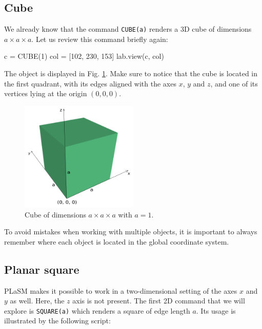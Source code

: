 \subsection{Cube}

We already know that the command {\tt CUBE(a)} renders a 3D cube of
dimensions $a \times a \times a$. Let us review this command briefly again:

\begin{bluecode}
c = CUBE(1)
col = [102, 230, 153]
lab.view(c, col)
\end{bluecode}
\newpage
\noindent
The object is displayed in Fig. \ref{fig:cube-111}. Make sure to 
notice that the cube is located in the first quadrant, with its 
edges aligned with the axes $x$, $y$ and $z$, and one of its vertices
lying at the origin $(0, 0, 0)$.

\begin{figure}[!ht]
\begin{center}
\includegraphics[width=0.5\textwidth]{img/cube-111.png}
\end{center}
\vspace{-4mm}
\caption{Cube of dimensions $a \times a \times a$ with $a = 1$.}
\label{fig:cube-111}
\end{figure}
\noindent

\begin{gbox}
To avoid mistakes when working with 
multiple objects, it is important to always remember where
each object is located in the global coordinate system.
\end{gbox}

\subsection{Planar square}

PLaSM makes it possible to work in a two-dimensional setting of the 
axes $x$ and $y$ as well. Here, the $z$ axis is not present. The first 
2D command that we will explore is {\tt SQUARE(a)} which renders 
a square of edge length $a$. Its usage is illustrated by the 
following script:

